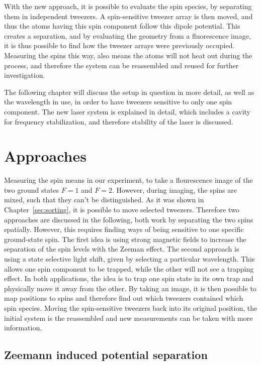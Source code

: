 With the new approach, it is possible to evaluate the spin species, by separating them in independent tweezers. A spin-sensitive tweezer array is then moved, and thus the atoms having this spin component follow this dipole potential. This creates a separation, and by evaluating the geometry from a fluorescence image, it is thus possible to find how the tweezer arrays were previously occupied. Measuring the spins this way, also means the atoms will not heat out during the process, and therefore the system can be reassembled and reused for further investigation.

The following chapter will discuss the setup in question in more detail, as well as the wavelength in use, in order to have tweezers sensitive to only one spin component. The new laser system is explained in detail, which includes a cavity for frequency stabilization, and therefore stability of the laser is discussed.

\section{Approaches}

Measuring the spin means in our experiment, to take a flourescence image of the two ground states $F=1$ and $F=2$. However, during imaging, the spins are mixed, such that they can't be distinguished. As it was shown in Chapter~\ref{sec:sorting}, it is possible to move selected tweezers. Therefore two approaches are discussed in the following, both work by separating the two spins spatially. However, this requires finding ways of being sensitive to one specific ground-state spin. The first idea is using strong magnetic fields to increase the separation of the spin levels with the Zeeman effect. The second approach is using a state selective light shift, given by selecting a particular wavelength. This allows one spin component to be trapped, while the other will not see a trapping effect. In both applications, the idea is to trap one spin state in its own trap and physically move it away from the other. By taking an image, it is then possible to map positions to spins and therefore find out which tweezers contained which spin species. Moving the spin-sensitive tweezers back into its original position, the initial system is the reassembled and new measurements can be taken with more information.

\subsection{Zeemann induced potential separation}

